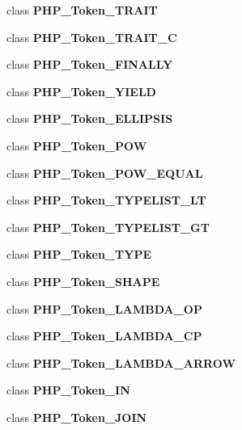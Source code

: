 \begin{DoxyCompactItemize}
class {\bf P\+H\+P\+\_\+\+Token\+\_\+\+T\+R\+A\+I\+T}
\item 
class {\bf P\+H\+P\+\_\+\+Token\+\_\+\+T\+R\+A\+I\+T\+\_\+\+C}
\item 
class {\bf P\+H\+P\+\_\+\+Token\+\_\+\+F\+I\+N\+A\+L\+L\+Y}
\item 
class {\bf P\+H\+P\+\_\+\+Token\+\_\+\+Y\+I\+E\+L\+D}
\item 
class {\bf P\+H\+P\+\_\+\+Token\+\_\+\+E\+L\+L\+I\+P\+S\+I\+S}
\item 
class {\bf P\+H\+P\+\_\+\+Token\+\_\+\+P\+O\+W}
\item 
class {\bf P\+H\+P\+\_\+\+Token\+\_\+\+P\+O\+W\+\_\+\+E\+Q\+U\+A\+L}
\item 
class {\bf P\+H\+P\+\_\+\+Token\+\_\+\+T\+Y\+P\+E\+L\+I\+S\+T\+\_\+\+L\+T}
\item 
class {\bf P\+H\+P\+\_\+\+Token\+\_\+\+T\+Y\+P\+E\+L\+I\+S\+T\+\_\+\+G\+T}
\item 
class {\bf P\+H\+P\+\_\+\+Token\+\_\+\+T\+Y\+P\+E}
\item 
class {\bf P\+H\+P\+\_\+\+Token\+\_\+\+S\+H\+A\+P\+E}
\item 
class {\bf P\+H\+P\+\_\+\+Token\+\_\+\+L\+A\+M\+B\+D\+A\+\_\+\+O\+P}
\item 
class {\bf P\+H\+P\+\_\+\+Token\+\_\+\+L\+A\+M\+B\+D\+A\+\_\+\+C\+P}
\item 
class {\bf P\+H\+P\+\_\+\+Token\+\_\+\+L\+A\+M\+B\+D\+A\+\_\+\+A\+R\+R\+O\+W}
\item 
class {\bf P\+H\+P\+\_\+\+Token\+\_\+\+I\+N}
\item 
class {\bf P\+H\+P\+\_\+\+Token\+\_\+\+J\+O\+I\+N}
\end{DoxyCompactItemize}
